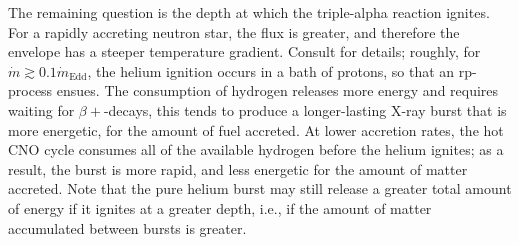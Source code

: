 The remaining question is the depth at which the triple-alpha reaction ignites.  For a rapidly accreting neutron star, the flux is greater, and therefore the envelope has a steeper temperature gradient. Consult \citet{bildsten:thermonuclear} for details; roughly, for $\dot{m} \gtrsim 0.1\dot{m}_{\mathrm{Edd}}$, the helium ignition occurs in a bath of protons, so that an rp-process ensues. The consumption of hydrogen releases more energy and requires waiting for $\beta+$-decays, this tends to produce a longer-lasting X-ray burst that is more energetic, for the amount of fuel accreted.    At lower accretion rates, the hot CNO cycle consumes all of the available hydrogen before the helium ignites; as a result, the burst is more rapid, and less energetic for the amount of matter accreted.  Note that the pure helium burst may still release a greater total amount of energy if it ignites at a greater depth, i.e., if the amount of matter accumulated between bursts is greater.

